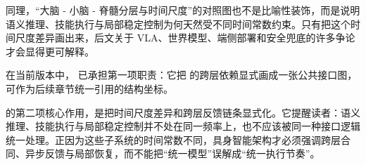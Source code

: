 同理，“大脑 - 小脑 - 脊髓分层与时间尺度”的对照图也不是比喻性装饰，而是说明语义推理、技能执行与局部稳定控制为何天然受不同时间常数约束。只有把这个时间尺度差异画出来，后文关于 VLA、世界模型、端侧部署和安全兜底的许多争论才会显得更可解释。

在当前版本中，\texttt{} 已承担第一项职责：它把 \texttt{} 的跨层依赖显式画成一张公共接口图，可作为后续章节统一引用的结构坐标。

\texttt{} 的第二项核心作用，是把时间尺度差异和跨层反馈链条显式化。它提醒读者：语义推理、技能执行与局部稳定控制并不处在同一频率上，也不应该被同一种接口逻辑统一处理。正因为这些子系统的时间常数不同，具身智能架构才必须强调跨层合同、异步反馈与局部恢复，而不能把“统一模型”误解成“统一执行节奏”。
